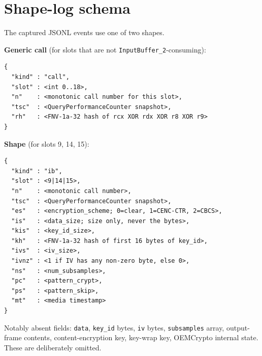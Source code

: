 \documentclass[11pt,letterpaper]{article}
\let\oldsection\section
\renewcommand{\section}{\clearpage\oldsection}
\begin{document}
\section{Shape-log schema}
\label{app:schema}

The captured JSONL events use one of two shapes.

\textbf{Generic call} (for slots that are not
\texttt{InputBuffer\_2}-consuming):
\begin{lstlisting}[basicstyle=\ttfamily\footnotesize]
{
  "kind" : "call",
  "slot" : <int 0..18>,
  "n"    : <monotonic call number for this slot>,
  "tsc"  : <QueryPerformanceCounter snapshot>,
  "rh"   : <FNV-1a-32 hash of rcx XOR rdx XOR r8 XOR r9>
}
\end{lstlisting}

\textbf{Shape} (for slots 9, 14, 15):
\begin{lstlisting}[basicstyle=\ttfamily\footnotesize]
{
  "kind" : "ib",
  "slot" : <9|14|15>,
  "n"    : <monotonic call number>,
  "tsc"  : <QueryPerformanceCounter snapshot>,
  "es"   : <encryption_scheme; 0=clear, 1=CENC-CTR, 2=CBCS>,
  "is"   : <data_size; size only, never the bytes>,
  "kis"  : <key_id_size>,
  "kh"   : <FNV-1a-32 hash of first 16 bytes of key_id>,
  "ivs"  : <iv_size>,
  "ivnz" : <1 if IV has any non-zero byte, else 0>,
  "ns"   : <num_subsamples>,
  "pc"   : <pattern_crypt>,
  "ps"   : <pattern_skip>,
  "mt"   : <media timestamp>
}
\end{lstlisting}

Notably absent fields:
\texttt{data}, \texttt{key\_id} bytes, \texttt{iv} bytes,
\texttt{subsamples} array, output-frame contents,
content-encryption key, key-wrap key, OEMCrypto internal state.
These are deliberately omitted.
\end{document}
